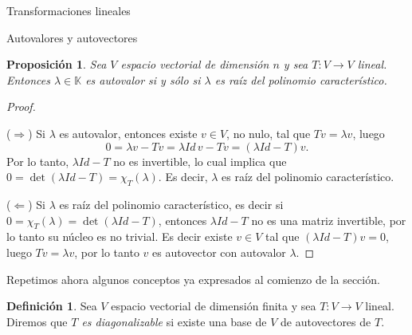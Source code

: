 \documentclass[a4paper,12pt,twoside,spanish]{amsbook}
\newtheorem{proposicion}[teorema]{Proposici\'on}
\theoremstyle{definition}
\newtheorem{definicion}{Definici\'on}[section]
\newtheorem{ejemplo}{Ejemplo}[section]
\theoremstyle{remark}
\newcommand{\K}{\mathbb K}
\begin{document}
\begin{chapter}{Transformaciones lineales}
\begin{section}{Autovalores y autovectores}
	\begin{comment}
		\begin{ejemplo}
		Sea
		$$ 
		A=\begin{bmatrix}1&2&1\\ 6&-1&0\\ -1&-2&-1\end{bmatrix},
		$$
		entonces el  polinomio característico de $A$ es
		$$
		\det \begin{bmatrix}1-x&2&1\\ 6&-1-x&0\\ -1&-2&-1-x\end{bmatrix} = -x^3 - x^2 + 12 x.
		$$
		Es posible factorizar esta expresión y obtenemos
		$$
		\chi_A(x) = -x(x-3)(x+4).
		$$
		\end{ejemplo}
	\end{comment}	
		
	

		
		\begin{proposicion}\label{autovalores}
			Sea $V$ espacio vectorial de dimensión $n$ y sea $T: V \to V$ lineal. Entonces $\lambda\in \K$ es autovalor si y sólo si $\lambda$ es raíz del polinomio característico.  
		\end{proposicion}
		\begin{proof}${}^{}$
			
			($\Rightarrow$) Si $\lambda$ es autovalor, entonces existe $v \in V$, no nulo, tal que $Tv = \lambda v$, luego 
			$$
			0 = \lambda v-Tv  =  \lambda Id \, v - Tv =  (\lambda Id-T)v.
			$$
			Por lo tanto, $\lambda Id-T$ no es invertible, lo cual implica que $0 = \det(\lambda Id-T) = \chi_T(\lambda)$. Es decir, $\lambda$ es raíz del polinomio característico. 
			
			($\Leftarrow$) Si $\lambda$ es raíz del polinomio característico, es decir si $0 = \chi_T(\lambda) = \det(\lambda Id-T)$, entonces $\lambda Id-T$ no es una matriz invertible, por lo tanto  su núcleo es no trivial. Es decir existe $v \in V$ tal que $(\lambda Id-T)v =0$, luego $Tv =\lambda v$, por lo tanto $v$ es autovector con autovalor $\lambda$.   
		\end{proof}
		
		Repetimos ahora algunos conceptos ya expresados al comienzo de la sección. 
		
		\begin{definicion}
			Sea $V$ espacio vectorial de dimensión finita y sea $T: V \to V$ lineal. Diremos que \textit{$T$ es diagonalizable} si existe una base de $V$ de autovectores de $T$. 
		\end{definicion}	
		

\end{section}
\end{chapter}
\end{document}
